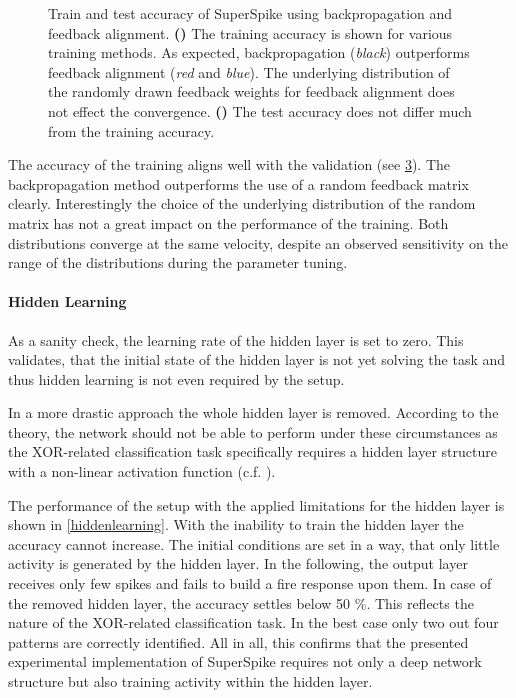 \begin{figure}
	\begin{subfigure}[c]{0.5\textwidth}
		\centering
		\caption{}
		
		\label{bptrain73}
	\end{subfigure}	
	\begin{subfigure}[c]{0.5\textwidth}
		\centering
		\caption{}
		
		\label{bptest73}
	\end{subfigure}
	\caption[Train and test accuracy of SuperSpike using backpropagation and feedback alignment.]{Train and test accuracy of SuperSpike using backpropagation and feedback alignment. \textbf{()} The training accuracy is shown for various training methods. As expected, backpropagation (\textit{black}) outperforms feedback alignment (\textit{red} and \textit{blue}). The underlying distribution of the randomly drawn feedback weights for feedback alignment does not effect the convergence. \textbf{()} The test accuracy does not differ much from the training accuracy.}
	\label{BPvsFA73}
\end{figure}

The accuracy of the training aligns well with the validation (see \cref{BPvsFA73}). The backpropagation method outperforms the use of a random feedback matrix clearly. Interestingly the choice of the underlying distribution of the random matrix has not a great impact on the performance of the training. Both distributions converge at the same velocity, despite an observed sensitivity on the range of the distributions during the parameter tuning.

\paragraph{Hidden Learning}
As a sanity check, the learning rate of the hidden layer is set to zero. This validates, that the initial state of the hidden layer is not yet solving the task and thus hidden learning is not even required by the setup.

In a more drastic approach the whole hidden layer is removed. According to the theory, the network should not be able to perform under these circumstances as the XOR-related classification task specifically requires a hidden layer structure with a non-linear activation function (c.f. \citealp{Goodfellow-et-al-2016}).

The performance of the setup with the applied limitations for the hidden layer is shown in \cref{hiddenlearning}. With the inability to train the hidden layer the accuracy cannot increase. The initial conditions are set in a way, that only little activity is generated by the hidden layer. In the following, the output layer receives only few spikes and fails to build a fire response upon them. In case of the removed hidden layer, the accuracy settles below 50 \%. This reflects the nature of the XOR-related classification task. In the best case only two out four patterns are correctly identified. 
All in all, this confirms that the presented experimental implementation of SuperSpike requires not only a deep network structure but also training activity within the hidden layer.

